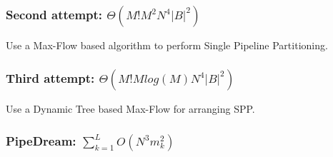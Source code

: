 \documentclass[12pt,letterpaper]{article}
\begin{document}
\subsubsection* {Second attempt:
$\Theta(M!M^2N^4|B|^2)$}
Use a Max-Flow based algorithm to perform Single Pipeline Partitioning.
\subsubsection* {Third attempt:
$\Theta(M!Mlog(M)N^4|B|^2)$}
Use a Dynamic Tree based Max-Flow for arranging SPP.

\subsubsection* {PipeDream: $\sum_{k=1}^L O(N^3m_k^2)$}
\end{document}
